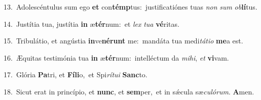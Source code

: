 {\numbfont\textcolor{\numbcolor}{13.}}~Adolescéntulus sum ego \textbf{et} con\-\textbf{témp}\-tus:~\star justificatiónes tuas \textit{non} \textit{sum} \textit{ob}\-\textbf{lí}tus.\par
{\numbfont\textcolor{\numbcolor}{14.}}~Justítia tua, justítia \textbf{in} æ\-\textbf{tér}\-num:~\star et \textit{lex} \textit{tu}\-\textit{a} \textbf{vé}\-ritas.\par
{\numbfont\textcolor{\numbcolor}{15.}}~Tribulátio, et angústia \textbf{in}\-ve\-\textbf{né}\-\textbf{runt} me:~\star mandáta tua medi\-\textit{tá}\-\textit{ti}\textit{o} \textbf{me}\-a est.\par
{\numbfont\textcolor{\numbcolor}{16.}}~Æquitas testimónia tua \textbf{in} æ\-\textbf{tér}\-num:~\star intelléctum da \textit{mi}\-\textit{hi}, \textit{et} \textbf{vi}\-vam.\par
{\numbfont\textcolor{\numbcolor}{17.}}~Glória \textbf{Pa}\-tri, et \textbf{Fí}\-\textbf{li}o,~\star et Spi\-\textit{rí}\-\textit{tu}\textit{i} \textbf{Sanc}\-to.\par
{\numbfont\textcolor{\numbcolor}{18.}}~Sicut erat in princípio, et \textbf{nunc}\-, et \textbf{sem}\-per,~\star et in sǽcula sæ\-\textit{cu}\-\textit{ló}\textit{rum}. \textbf{A}\-men.\par
